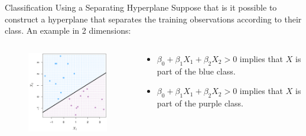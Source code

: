 \documentclass[
  ignorenonframetext,
  aspectratio=169,
]{beamer}
\begin{document}
\begin{frame}{Classification Using a Separating Hyperplane}
\protect\hypertarget{classification-using-a-separating-hyperplane-1}{}
Suppose that is it possible to construct a hyperplane that separates the
training observations according to their class. An example in 2
dimensions:

\begin{columns}[T]
\begin{column}{0.5\textwidth}
\begin{figure}

{\centering \includegraphics[width=2.60417in,height=\textheight]{images/sep_hyperplane.png}

}

\end{figure}
\end{column}

\begin{column}{0.5\textwidth}
\begin{itemize}
\item
  \(\beta_{0}+\beta_{1} X_{1}+\beta_{2} X_{2}>0\) implies that \(X\) is
  part of the blue class.
\item
  \(\beta_{0}+\beta_{1} X_{1}+\beta_{2} X_{2}>0\) implies that \(X\) is
  part of the purple class.
\end{itemize}
\end{column}
\end{columns}
\end{frame}
\end{document}
